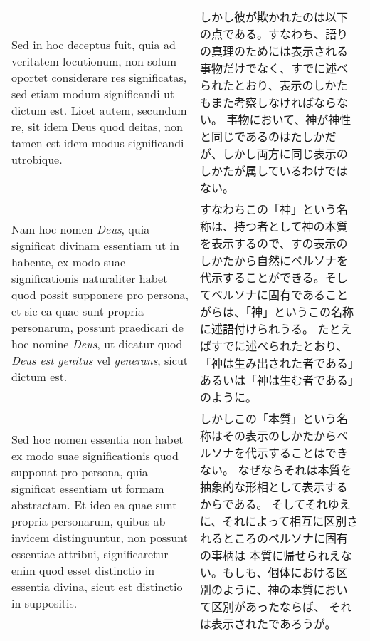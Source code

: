 \documentclass[10pt]{jsarticle} %
\begin{document}
\begin{longtable}{p{21em}p{21em}}
\\



Sed in hoc deceptus fuit, quia ad veritatem locutionum, non solum
oportet considerare res significatas, sed etiam modum significandi ut dictum
est. Licet autem, secundum re, sit idem Deus quod deitas, non tamen est idem
modus significandi utrobique. 

&

しかし彼が欺かれたのは以下の点である。すなわち、語りの真理のためには表示される事物だけでなく、すでに述べられたとおり、表示のしかたもまた考察しなければならない。
事物において、神が神性と同じであるのはたしかだが、しかし両方に同じ表示のしかたが属しているわけではない。

\\



Nam hoc nomen \textit{Deus}, quia significat divinam
essentiam ut in habente, ex modo suae significationis naturaliter habet quod
possit supponere pro persona, et sic ea quae sunt propria personarum, possunt
praedicari de hoc nomine \textit{Deus}, ut dicatur quod \textit{Deus est genitus} vel \textit{generans},
sicut dictum est. 

&

すなわちこの「神」という名称は、持つ者として神の本質を表示するので、すの表示のしかたから自然にペルソナを代示することができる。そしてペルソナに固有であることがらは、「神」というこの名称に述語付けられうる。
たとえばすでに述べられたとおり、「神は生み出された者である」あるいは「神は生む者である」のように。

\\



Sed hoc nomen essentia non habet ex modo suae significationis
quod supponat pro persona, quia significat essentiam ut formam abstractam. Et
ideo ea quae sunt propria personarum, quibus ab invicem distinguuntur, non
possunt essentiae attribui, significaretur enim quod esset distinctio in
essentia divina, sicut est distinctio in suppositis.


&

しかしこの「本質」という名称はその表示のしかたからペルソナを代示することはできない。
なぜならそれは本質を抽象的な形相として表示するからである。
そしてそれゆえに、それによって相互に区別されるところのペルソナに固有の事柄は
本質に帰せられえない。もしも、個体における区別のように、神の本質において区別があったならば、
それは表示されたであろうが。

\\



\end{longtable}
\end{document}
